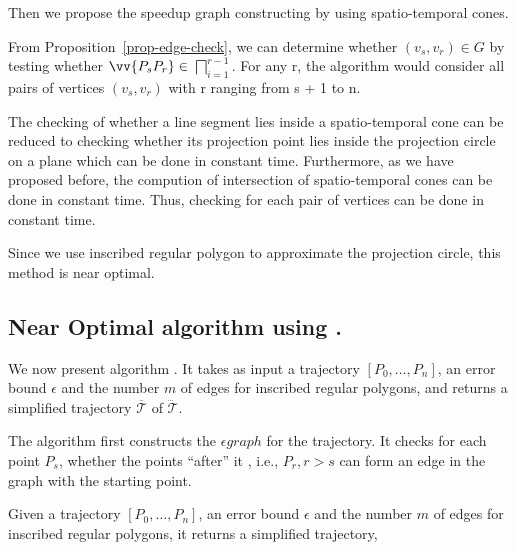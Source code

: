 Then we propose the speedup graph constructing by using spatio-temporal cones.

From Proposition~\ref{prop-edge-check}, we can determine whether $(v_s,v_r) \in
G$ by testing whether $\vv{P_sP_r} \in $ $\bigsqcap_{i=1}^{r - 1}$. For any r, the algorithm would consider all
pairs of vertices  $(v_s,v_r)$ with  r ranging from s + 1 to n.  

The checking of whether a line segment lies inside a spatio-temporal cone can be
reduced to checking whether its projection point lies inside the projection
circle on a plane which can be done in constant time. Furthermore, as we have
proposed before, the compution of intersection of spatio-temporal cones can be
done in constant time. Thus, checking for each pair of vertices can be done in
constant time.

Since we use inscribed regular polygon to approximate the projection circle,
this method is near optimal.

\subsection{Near Optimal algorithm using \sed.}


We now present algorithm \cisto. It takes as input a trajectory ${[P_0, \ldots, P_n]}$, an error bound $\epsilon$ and the number $m$ of edges for inscribed regular polygons, and returns a simplified  trajectory $\overline{\mathcal{T}}$ of $\dddot{\mathcal{T}}$.

The algorithm first  constructs the $\epsilon graph$ for the trajectory. It
checks for each point $P_s$, whether the points ``after'' it , i.e., $P_r,r > s$
can form an edge in the graph with the starting point. 

Given a trajectory ${[P_0, \ldots, P_n]}$, an error bound $\epsilon$ and the number $m$ of edges for inscribed
regular polygons, it returns a simplified trajectory,


